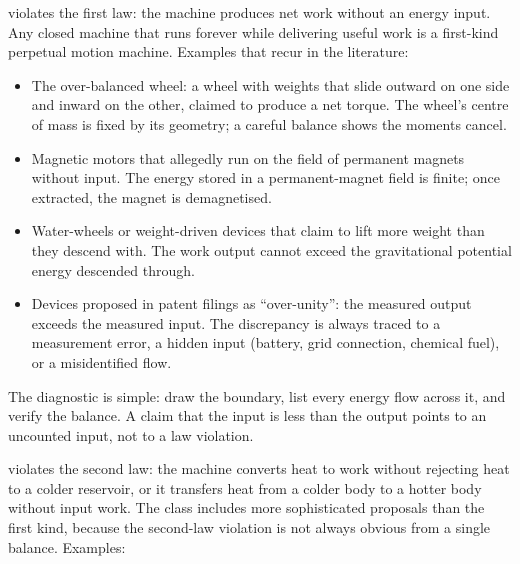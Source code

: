  violates the first law:
the machine produces net work without an energy input. Any closed
machine that runs forever while delivering useful work is a
first-kind perpetual motion machine. Examples that recur in the
literature:

\begin{itemize}[leftmargin=*]
  \item The over-balanced wheel: a wheel with weights that slide
    outward on one side and inward on the other, claimed to produce a
    net torque. The wheel's centre of mass is fixed by its geometry; a
    careful balance shows the moments cancel.
  \item Magnetic motors that allegedly run on the field of permanent
    magnets without input. The energy stored in a permanent-magnet
    field is finite; once extracted, the magnet is demagnetised.
  \item Water-wheels or weight-driven devices that claim to lift more
    weight than they descend with. The work output cannot exceed the
    gravitational potential energy descended through.
  \item Devices proposed in patent filings as ``over-unity'': the
    measured output exceeds the measured input. The discrepancy is
    always traced to a measurement error, a hidden input (battery,
    grid connection, chemical fuel), or a misidentified flow.
\end{itemize}

The diagnostic is simple: draw the boundary, list every energy flow
across it, and verify the balance. A claim that the input is less
than the output points to an uncounted input, not to a law violation.

 violates the second
law: the machine converts heat to work without rejecting heat to a
colder reservoir, or it transfers heat from a colder body to a hotter
body without input work. The class includes more sophisticated
proposals than the first kind, because the second-law violation is
not always obvious from a single balance. Examples:

